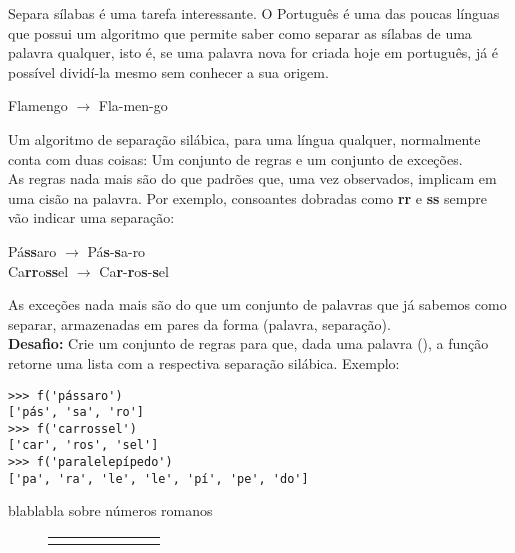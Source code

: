 \documentclass[12pt]{article}
\begin{document}
	
	
	Separa sílabas é uma tarefa interessante. O Português é uma das poucas línguas que possui um algoritmo que permite saber como separar as sílabas de uma palavra qualquer, isto é, se uma palavra nova for criada hoje em português, já é possível dividí-la mesmo sem conhecer a sua origem.
	
	\begin{center}
		Flamengo $\to$ Fla-men-go
	\end{center}
	
	Um algoritmo de separação silábica, para uma língua qualquer, normalmente conta com duas coisas: Um conjunto de regras e um conjunto de exceções.\\
	
	As regras nada mais são do que padrões que, uma vez observados, implicam em uma cisão na palavra. Por exemplo, consoantes dobradas como \textbf{rr} e \textbf{ss} sempre vão indicar uma separação:
	
	\begin{center}
		Pá\textbf{ss}aro $\to$ Pá\textbf{s}-\textbf{s}a-ro\\
		Ca\textbf{rr}o\textbf{ss}el $\to$ Ca\textbf{r}-\textbf{r}o\textbf{s}-\textbf{s}el
	\end{center}
	
	As exceções nada mais são do que um conjunto de palavras que já sabemos como separar, armazenadas em pares da forma (palavra, separação).\\
	
	\textbf{Desafio:} Crie um conjunto de regras para que, dada uma palavra (), a função retorne uma lista com a respectiva separação silábica. Exemplo:
	
	\begin{lstlisting}[caption="Separando sílabas"]
>>> f('pássaro')
['pás', 'sa', 'ro']
>>> f('carrossel')
['car', 'ros', 'sel']
>>> f('paralelepípedo')
['pa', 'ra', 'le', 'le', 'pí', 'pe', 'do']
	\end{lstlisting}
	
	
	blablabla sobre números romanos\\
	
	\begin{figure}
		\centering
		\begin{tabular}{|c|c|c|c|c|c|c|}
		\hline		
		& & & & & &\\
		\hline
		& & & & & &\\
		\hline
		\end{tabular}
	\end{figure}
	
\end{document}
